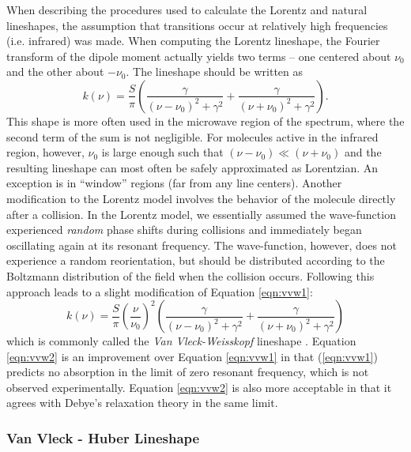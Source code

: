 \documentclass[11pt]{article}
\begin{document}
When describing the procedures used to calculate
the Lorentz and natural lineshapes, the assumption that transitions occur
at relatively high frequencies (i.e. infrared) was made.  When
computing the Lorentz lineshape, the Fourier transform of the dipole moment 
actually yields two terms -- one centered about $\nu_{0}$ and
the other about $-\nu_{0}$. The lineshape should be written as 
\cite{van:45}
\begin{equation}
k(\nu)=\frac{S}{\pi}\left(\frac{\gamma}{(\nu-\nu_0)^{2}+\gamma^{2}}
+ \frac{\gamma}{(\nu+\nu_0)^{2}+\gamma^{2}}\right).
\label{eqn:vvw1}
\end{equation}
This shape is more often used in the microwave
region of the spectrum, where the second term of the sum is not negligible.
For molecules active in the infrared region, however,  $\nu_{0}$ is large
enough such that $(\nu-\nu_{0}) \ll (\nu+\nu_{0})$ and the resulting
lineshape can most often be safely approximated as Lorentzian.  An
exception is in ``window'' regions (far from any line centers).
Another modification to
the Lorentz model involves the behavior of the molecule directly after a 
collision.  In the Lorentz model, we essentially assumed the wave-function 
experienced {\it random} phase shifts during collisions and immediately
began oscillating again at its resonant frequency.  The wave-function,
however, does not experience a random reorientation, but should be
distributed according to the Boltzmann distribution of the field when the
collision occurs\cite{van:77}.  Following this approach leads to a slight 
modification of Equation \ref{eqn:vvw1}:
\begin{equation}
k(\nu)=\frac{S}{\pi}\left(\frac{\nu}{\nu_0}\right)^2 
\left(\frac{\gamma}{(\nu-\nu_0)^{2}+\gamma^{2}}
+ \frac{\gamma}{(\nu+\nu_0)^{2}+\gamma^{2}}\right)
\label{eqn:vvw2}
\end{equation}
which is commonly called the {\it Van Vleck-Weisskopf} lineshape 
\cite{van:45}.
Equation \ref{eqn:vvw2} is an improvement over Equation \ref{eqn:vvw1} in
that (\ref{eqn:vvw1}) predicts no absorption in the limit of zero resonant
frequency, which is not observed experimentally.  Equation \ref{eqn:vvw2}
is also more acceptable in that it agrees with 
Debye's\cite{van:77} relaxation theory in the same limit.

\subsubsection{Van Vleck - Huber Lineshape }\label{sec:vvh}
\end{document}
